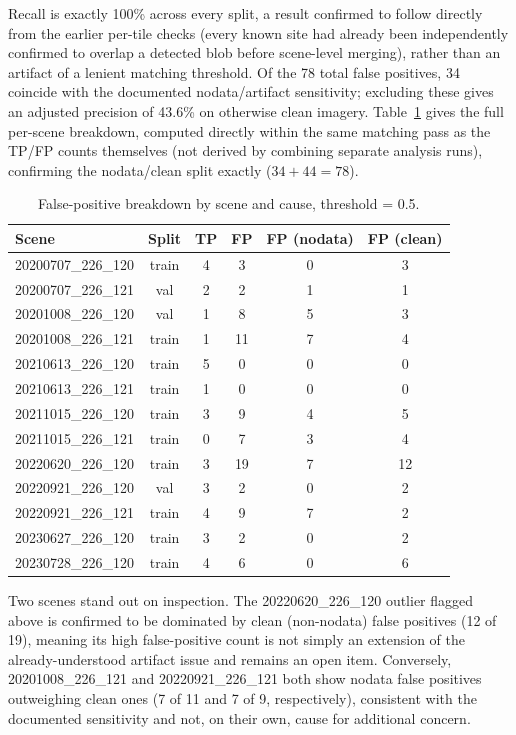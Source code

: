 \documentclass[11pt,a4paper]{article}
\begin{document}
Recall is exactly 100\% across every split, a result confirmed to follow
directly from the earlier per-tile checks (every known site had already been
independently confirmed to overlap a detected blob before scene-level
merging), rather than an artifact of a lenient matching threshold. Of the 78
total false positives, 34 coincide with the documented nodata/artifact
sensitivity; excluding these gives an adjusted precision of 43.6\% on
otherwise clean imagery. Table~\ref{tab:fpbreakdown} gives the full
per-scene breakdown, computed directly within the same matching pass as
the TP/FP counts themselves (not derived by combining separate analysis
runs), confirming the nodata/clean split exactly ($34 + 44 = 78$).

\begin{table}[htbp]
\centering
\caption{False-positive breakdown by scene and cause, threshold = 0.5.}
\label{tab:fpbreakdown}
\begin{tabular}{lccccc}
\toprule
\textbf{Scene} & \textbf{Split} & \textbf{TP} & \textbf{FP} & \textbf{FP (nodata)} & \textbf{FP (clean)} \\
\midrule
20200707\_226\_120 & train & 4 & 3  & 0 & 3 \\
20200707\_226\_121 & val   & 2 & 2  & 1 & 1 \\
20201008\_226\_120 & val   & 1 & 8  & 5 & 3 \\
20201008\_226\_121 & train & 1 & 11 & 7 & 4 \\
20210613\_226\_120 & train & 5 & 0  & 0 & 0 \\
20210613\_226\_121 & train & 1 & 0  & 0 & 0 \\
20211015\_226\_120 & train & 3 & 9  & 4 & 5 \\
20211015\_226\_121 & train & 0 & 7  & 3 & 4 \\
20220620\_226\_120 & train & 3 & 19 & 7 & 12 \\
20220921\_226\_120 & val   & 3 & 2  & 0 & 2 \\
20220921\_226\_121 & train & 4 & 9  & 7 & 2 \\
20230627\_226\_120 & train & 3 & 2  & 0 & 2 \\
20230728\_226\_120 & train & 4 & 6  & 0 & 6 \\
\bottomrule
\end{tabular}
\end{table}

Two scenes stand out on inspection. The 20220620\_226\_120 outlier flagged
above is confirmed to be dominated by clean (non-nodata) false positives
(12 of 19), meaning its high false-positive count is not simply an
extension of the already-understood artifact issue and remains an open
item. Conversely, 20201008\_226\_121 and 20220921\_226\_121 both show
nodata false positives outweighing clean ones (7 of 11 and 7 of 9,
respectively), consistent with the documented sensitivity and not, on
their own, cause for additional concern.
\end{document}
